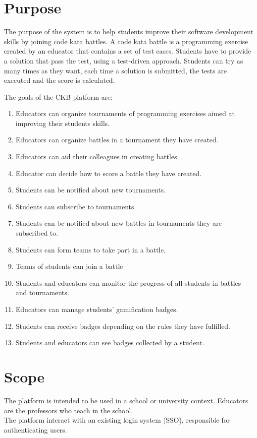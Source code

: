 \section{Purpose}
The purpose of the system is to help students improve their software development skills by joining code kata battles.
A code kata battle is a programming exercise created by an educator that contains a set of test cases.
Students have to provide a solution that pass the test, using a test-driven approach.
Students can try as many times as they want, each time a solution is submitted, the tests are executed and the score is calculated.

The goals of the CKB platform are:
\begin{enumerate}[label=\textbf{G\arabic*}:,leftmargin=1.3cm]
    \item Educators can organize tournaments of programming exercises aimed at improving their students skills.
    \item Educators can organize battles in a tournament they have created.
    \item Educators can aid their colleagues in creating battles.
    \item Educator can decide how to score a battle they have created.
    \item Students can be notified about new tournaments.
    \item Students can subscribe to tournaments.
    \item Students can be notified about new battles in tournaments they are subscribed to.
    \item Students can form teams to take part in a battle.
    \item Teams of students can join a battle
    \item Students and educators can monitor the progress of all students in battles and tournaments.
    \item Educators can manage students’ gamification badges.
    \item Students can receive badges depending on the rules they have fulfilled.
    \item Students and educators can see badges collected by a student.
\end{enumerate}

\section{Scope}
The platform is intended to be used in a school or university context.
Educators are the professors who teach in the school.\\
The platform interact with an existing login system (SSO), responsible for authenticating users.

